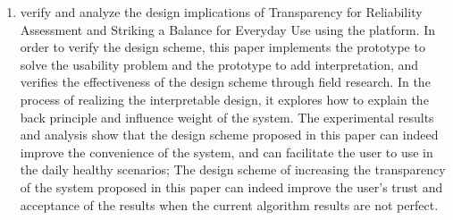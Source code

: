 \documentclass[type=master]{fduthesis}
\begin{document}
\begin{abstract*}
\begin{enumerate}
    \item verify and analyze the design implications of Transparency for Reliability Assessment and Striking a Balance for Everyday Use using the platform.
   In order to verify the design scheme, this paper implements the prototype to solve the usability problem and the prototype to add interpretation, and verifies the effectiveness of the design scheme through field research. In the process of realizing the interpretable design, it explores how to explain the back principle and influence weight of the system.
  The experimental results and analysis show that the design scheme proposed in this paper can indeed improve the convenience of the system, and can facilitate the user to use in the daily healthy scenarios;
  The design scheme of increasing the transparency of the system proposed in this paper can indeed improve the user's trust and acceptance of the results when the current algorithm results are not perfect.

  \end{enumerate}
\end{abstract*}


\mainmatter







\backmatter





\end{document}
